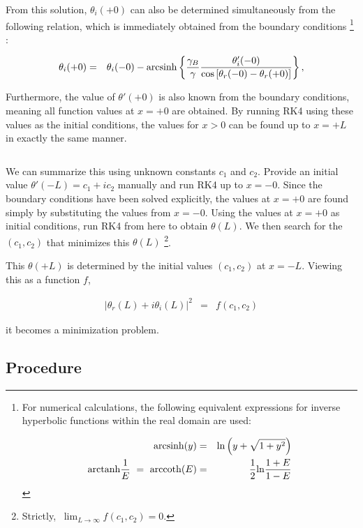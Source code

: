 \documentclass[uplatex,a4j,12pt,dvipdfmx]{jsarticle}
\begin{document}
From this solution, $\theta_{i}(+0)$ can also be determined simultaneously
from the following relation, which is immediately obtained from the boundary conditions
\footnote{
	For numerical calculations, the following equivalent expressions for inverse hyperbolic functions
	within the real domain are used:



	\begin{eqnarray}
		{\rm arcsinh}(y)
		&=&
		{\rm ln} \left( y + \sqrt{ 1 + y^{2} } \right)
		\\
		{\rm arctanh}\dfrac{1}{E}
		\ = \
		{\rm arccoth}(E)
		&=&
		\dfrac{1}{2}
		{\rm ln} \dfrac{1+E}{1-E}
	\end{eqnarray}


}
:

\begin{eqnarray}
	\theta_{i}(+0)
	&=&
	\theta_{i}(-0)
	-
	{\rm arcsinh}
	\left\{
	\dfrac{ \gamma_{B} }{ \gamma }
	\dfrac{ \theta_{i}'(-0) }{ {\rm cos} \left[ \theta_{r}(-0) - \theta_{r}(+0) \right] }
	\right\}
	,
\end{eqnarray}

Furthermore, the value of $\theta'(+0)$ is also known from the boundary conditions,
meaning all function values at $x=+0$ are obtained.
By running RK4 using these values as the initial conditions,
the values for $x>0$ can be found up to $x=+L$
in exactly the same manner.

${}$

We can summarize this using unknown constants $c_{1}$ and $c_{2}$.
Provide an initial value $\theta'(-L)=c_{1}+i c_{2}$ manually and run RK4 up to $x=-0$.
Since the boundary conditions have been solved explicitly,
the values at $x=+0$ are found simply by substituting the values from $x=-0$.
Using the values at $x=+0$ as initial conditions,
run RK4 from here to obtain $\theta(L)$.
We then search for the $(c_{1},c_{2})$ that minimizes
this $\theta(L)$
\footnote{Strictly, $\ \displaystyle \lim_{L \to \infty} f(c_{1},c_{2})=0$.}.

This $\theta(+L)$ is determined by the initial values $(c_{1},c_{2})$ at $x=-L$.
Viewing this as a function $f$,

\begin{eqnarray}
	\big| \theta_{r}(L) + i \theta_{i}(L) \big|^{2}
	&=&
	f(c_{1},c_{2})
\end{eqnarray}

it becomes a minimization problem.
\subsection{Procedure}
\end{document}
